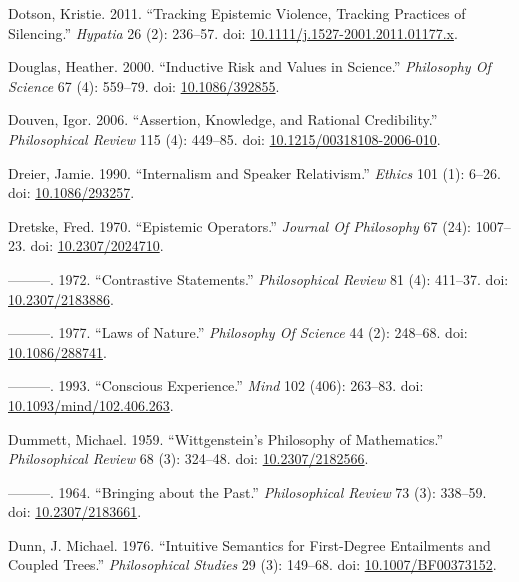 \documentclass[
  10pt,
  letterpaper,
  DIV=11,
  numbers=noendperiod,
  twoside]{scrartcl}
\newlength{\cslhangindent}
\newenvironment{CSLReferences}[2] %
 {\begin{list}{}{%
  \setlength{\itemindent}{0pt}
  \setlength{\leftmargin}{0pt}
  \setlength{\parsep}{0pt}
  \ifodd #1
   \setlength{\leftmargin}{\cslhangindent}
   \setlength{\itemindent}{-1\cslhangindent}
  \fi
  \setlength{\itemsep}{#2\baselineskip}}}
 {\end{list}}
\begin{document}
\begin{CSLReferences}{1}{0}
Dotson, Kristie. 2011. {``Tracking Epistemic Violence, Tracking
Practices of Silencing.''} \emph{Hypatia} 26 (2): 236--57. doi:
\href{https://doi.org/10.1111/j.1527-2001.2011.01177.x}{10.1111/j.1527-2001.2011.01177.x}.

Douglas, Heather. 2000. {``Inductive Risk and Values in Science.''}
\emph{Philosophy Of Science} 67 (4): 559--79. doi:
\href{https://doi.org/10.1086/392855}{10.1086/392855}.

Douven, Igor. 2006. {``Assertion, Knowledge, and Rational
Credibility.''} \emph{Philosophical Review} 115 (4): 449--85. doi:
\href{https://doi.org/10.1215/00318108-2006-010}{10.1215/00318108-2006-010}.

Dreier, Jamie. 1990. {``Internalism and Speaker Relativism.''}
\emph{Ethics} 101 (1): 6--26. doi:
\href{https://doi.org/10.1086/293257}{10.1086/293257}.

Dretske, Fred. 1970. {``Epistemic Operators.''} \emph{Journal Of
Philosophy} 67 (24): 1007--23. doi:
\href{https://doi.org/10.2307/2024710}{10.2307/2024710}.

---------. 1972. {``Contrastive Statements.''} \emph{Philosophical
Review} 81 (4): 411--37. doi:
\href{https://doi.org/10.2307/2183886}{10.2307/2183886}.

---------. 1977. {``Laws of Nature.''} \emph{Philosophy Of Science} 44
(2): 248--68. doi:
\href{https://doi.org/10.1086/288741}{10.1086/288741}.

---------. 1993. {``Conscious Experience.''} \emph{Mind} 102 (406):
263--83. doi:
\href{https://doi.org/10.1093/mind/102.406.263}{10.1093/mind/102.406.263}.

Dummett, Michael. 1959. {``Wittgenstein's Philosophy of Mathematics.''}
\emph{Philosophical Review} 68 (3): 324--48. doi:
\href{https://doi.org/10.2307/2182566}{10.2307/2182566}.

---------. 1964. {``Bringing about the Past.''} \emph{Philosophical
Review} 73 (3): 338--59. doi:
\href{https://doi.org/10.2307/2183661}{10.2307/2183661}.

Dunn, J. Michael. 1976. {``Intuitive Semantics for First-Degree
Entailments and Coupled Trees.''} \emph{Philosophical Studies} 29 (3):
149--68. doi:
\href{https://doi.org/10.1007/BF00373152}{10.1007/BF00373152}.


\end{CSLReferences}
\end{document}
